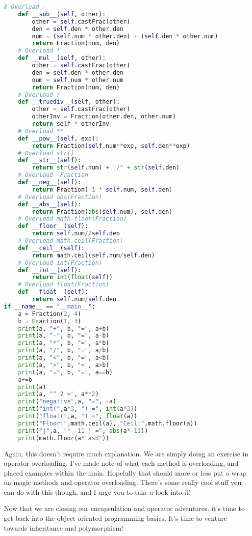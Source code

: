 \documentclass[11pt, twoside, reqno]{book}
\begin{document}
\begin{lstlisting}[language=Python]
    # Overload -
    def __sub__(self, other):
        other = self.castFrac(other)
        den = self.den * other.den
        num = (self.num * other.den) - (self.den * other.num)
        return Fraction(num, den)
    # Overload *
    def __mul__(self, other):
        other = self.castFrac(other)
        den = self.den * other.den
        num = self.num * other.num
        return Fraction(num, den)
    # Overload /
    def __truediv__(self, other):
        other = self.castFrac(other)
        otherInv = Fraction(other.den, other.num)
        return self * otherInv
    # Overload **
    def __pow__(self, exp):
        return Fraction(self.num**exp, self.den**exp)
    # Overload str()
    def __str__(self):
        return str(self.num) + "/" + str(self.den)
    # Overload -Fraction
    def __neg__(self):
        return Fraction(-1 * self.num, self.den)
    # Overload abs(Fraction)
    def __abs__(self):
        return Fraction(abs(self.num), self.den)
    # Overload math.floor(Fraction)
    def __floor__(self):
        return self.num//self.den
    # Overload math.ceil(Fraction)
    def __ceil__(self):
        return math.ceil(self.num/self.den)
    # Overload int(Fraction)
    def __int__(self):
        return int(float(self))
    # Overload float(Fraction)
    def __float__(self):
        return self.num/self.den
if __name__ == "__main__":
    a = Fraction(2, 4)
    b = Fraction(1, 3)
    print(a, "+", b, "=", a+b)
    print(a, "-", b, "=", a-b)
    print(a, "*", b, "=", a*b)
    print(a, "/", b, "=", a/b)
    print(a, "<", b, "=", a<b)
    print(a, ">", b, "=", a>b)
    print(a, "=", b, "=", a==b)
    a+=b
    print(a)
    print(a, "^ 2 =", a**2)
    print("negative",a, "=", -a)
    print("int(",a*3, ") =", int(a*3))
    print("float(",a, ") =", float(a))
    print("Floor:",math.ceil(a), "Ceil:",math.floor(a))
    print("|",a, "* -11 | =", abs(a*-11))
    print(math.floor(a*"asd"))
\end{lstlisting}

Again, this doesn't require much explanation. We are simply doing an exercise in operator overloading. I've made note of what each method is overloading, and placed examples within the main. Hopefully that should more or less put a wrap on magic methods and operator overloading. There's some really cool stuff you can do with this though, and I urge you to take a look into it!

Now that we are closing our encapsulation and operator adventures, it's time to get back into the object oriented programming basics. It's time to venture towards inheritance and polymorphism!
\end{document}
